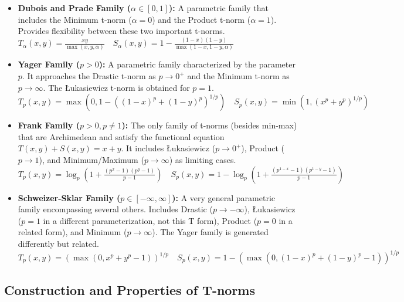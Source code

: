 \begin{example}
\begin{itemize}
    \item \textbf{Dubois and Prade Family ($\alpha \in [0, 1]$):}
    A parametric family that includes the Minimum t-norm ($\alpha=0$) and the Product t-norm ($\alpha=1$). Provides flexibility between these two important t-norms. \\
    $T_\alpha(x, y) = \frac{xy}{\max(x, y, \alpha)} \quad S_\alpha(x, y) = 1 - \frac{(1-x)(1-y)}{\max(1-x, 1-y, \alpha)}$ 

    \item \textbf{Yager Family ($p > 0$):}
    A parametric family characterized by the parameter $p$. It approaches the Drastic t-norm as $p \to 0^+$ and the Minimum t-norm as $p \to \infty$. The Łukasiewicz t-norm is obtained for $p=1$. \\
    $T_p(x, y) = \max(0, 1 - ((1-x)^p + (1-y)^p)^{1/p}) \quad S_p(x, y) = \min(1, (x^p + y^p)^{1/p})$

    \item \textbf{Frank Family ($p > 0, p \neq 1$):}
    The only family of t-norms (besides min-max) that are Archimedean and satisfy the functional equation $T(x, y) + S(x, y) = x + y$. It includes Łukasiewicz ($p \to 0^+$), Product ($p \to 1$), and Minimum/Maximum ($p \to \infty$) as limiting cases. \\
    $T_p(x, y) = \log_p \left( 1 + \frac{(p^x - 1)(p^y - 1)}{p - 1} \right) \quad S_p(x, y) = 1 - \log_p \left( 1 + \frac{(p^{1-x} - 1)(p^{1-y} - 1)}{p - 1} \right)$

    \item \textbf{Schweizer-Sklar Family ($p \in [-\infty, \infty]$):}
    A very general parametric family encompassing several others. Includes Drastic ($p \to -\infty$), Łukasiewicz ($p=1$ in a different parameterization, not this T form), Product ($p=0$ in a related form), and Minimum ($p \to \infty$). The Yager family is generated differently but related. \\
    $T_p(x, y) = (\max(0, x^p + y^p - 1))^{1/p} \quad S_p(x, y) = 1 - (\max(0, (1-x)^p + (1-y)^p - 1))^{1/p}$ 
  \end{itemize}
\end{example}





\subsection{Construction and Properties of T-norms} %

